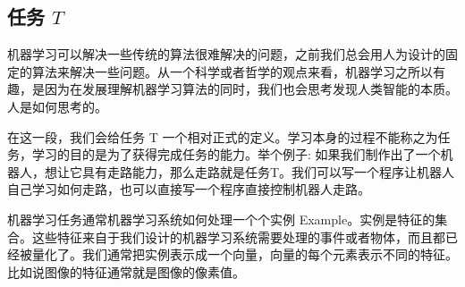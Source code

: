 \subsection{任务 $T$}
机器学习可以解决一些传统的算法很难解决的问题，之前我们总会用人为设计的固定的算法来解决一些问题。从一个科学或者哲学的观点来看，机器学习之所以有趣，是因为在发展理解机器学习算法的同时，我们也会思考发现人类智能的本质。人是如何思考的。

在这一段，我们会给任务 T 一个相对正式的定义。学习本身的过程不能称之为任务，学习的目的是为了获得完成任务的能力。举个例子: 如果我们制作出了一个机器人，想让它具有走路能力，那么走路就是任务T。我们可以写一个程序让机器人自己学习如何走路，也可以直接写一个程序直接控制机器人走路。

机器学习任务通常机器学习系统如何处理一个个实例 Example。实例是特征的集合。这些特征来自于我们设计的机器学习系统需要处理的事件或者物体，而且都已经被量化了。我们通常把实例表示成一个向量，向量的每个元素表示不同的特征。比如说图像的特征通常就是图像的像素值。

